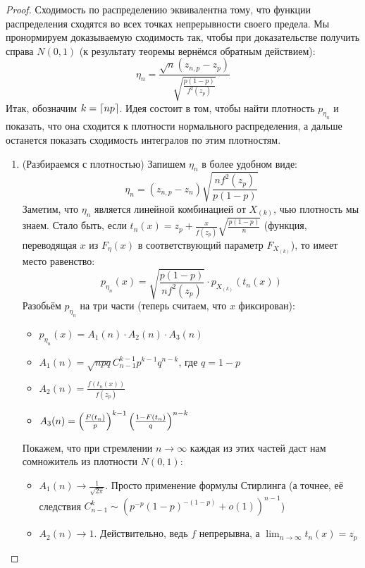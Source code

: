 \begin{proof}
	Сходимость по распределению эквивалентна тому, что функции распределения сходятся во всех точках непрерывности своего предела. Мы пронормируем доказываемую сходимость так, чтобы при доказательстве получить справа $N(0, 1)$ (к результату теоремы вернёмся обратным действием):
	\[
		\eta_n = \frac{\sqrt{n}(z_{n, p} - z_p)}{\sqrt{\frac{p(1 - p)}{f^2(z_p)}}}
	\]
	Итак, обозначим $k = \left\lceil np\right\rceil$. Идея состоит в том, чтобы найти плотность $p_{\eta_n}$ и показать, что она сходится к плотности нормального распределения, а дальше останется показать сходимость интегралов по этим плотностям.
	\begin{enumerate}
		\item (Разбираемся с плотностью) Запишем $\eta_n$ в более удобном виде:
		\[
			\eta_n = (z_{n, p} - z_n)\sqrt{\frac{nf^2(z_p)}{p(1 - p)}}
		\]
		Заметим, что $\eta_n$ является линейной комбинацией от $X_{(k)}$, чью плотность мы знаем. Стало быть, если $t_n(x) = z_p + \frac{x}{f(z_p)}\sqrt{\frac{p(1 - p)}{n}}$ (функция, переводящая $x$ из $F_\eta(x)$ в соответствующий параметр $F_{X_{(k)}}$), то имеет место равенство:
		\[
			p_{\eta_n}(x) = \sqrt{\frac{p(1 - p)}{nf^2(z_p)}} \cdot p_{X_{(k)}}(t_n(x))
		\]
		Разобьём $p_{\eta_n}$ на три части (теперь считаем, что $x$ фиксирован):
		\begin{itemize}
			\item $p_{\eta_n}(x) = A_1(n) \cdot A_2(n) \cdot A_3(n)$
			
			\item $A_1(n) = \sqrt{npq}C_{n - 1}^{k - 1}p^{k - 1}q^{n - k}$, где $q = 1 - p$
			
			\item $A_2(n) = \frac{f(t_n(x))}{f(z_p)}$
			
			\item $A_3(n) = \left(\frac{F(t_n)}{p}\right)^{k - 1}\left(\frac{1 - F(t_n)}{q}\right)^{n - k}$
		\end{itemize}
		Покажем, что при стремлении $n \to \infty$ каждая из этих частей даст нам сомножитель из плотности $N(0, 1)$:
		\begin{itemize}
			\item $A_1(n) \to \frac{1}{\sqrt{2\pi}}$. Просто применение формулы Стирлинга (а точнее, её следствия $C_{n - 1}^k \sim (p^{-p}(1 - p)^{-(1 - p)} + o(1))^{n - 1}$)
			
			\item $A_2(n) \to 1$. Действительно, ведь $f$ непрерывна, а $\lim_{n \to \infty} t_n(x) = z_p$
			

\end{itemize}
\end{enumerate}
\end{proof}

